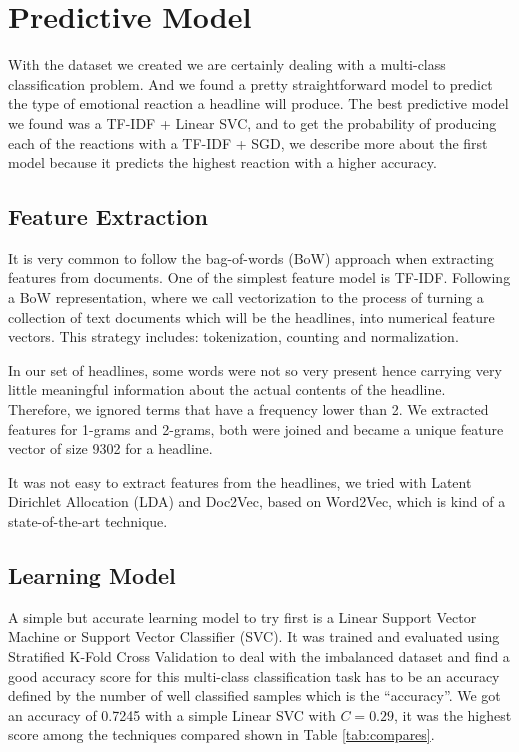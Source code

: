 \documentclass[9pt]{article}
\begin{document}
\section{Predictive Model} 

With the dataset we created we are certainly dealing with a multi-class classification problem. And we found a pretty straightforward model to predict the type of emotional reaction a headline will produce. The best predictive model we found was a TF-IDF + Linear SVC, and to get the probability of producing each of the reactions with a TF-IDF + SGD, we describe more about the first model because it predicts the highest reaction with a higher accuracy.

\subsection{Feature Extraction}

It is very common to follow the bag-of-words (BoW) approach when extracting features from documents. One of the simplest feature model is TF-IDF. Following a BoW representation, where we call vectorization to the process of turning a collection of text documents which will be the headlines, into numerical feature vectors. This strategy includes: tokenization, counting and normalization.

In our set of headlines, some words were not so very present hence carrying very little meaningful information about the actual contents of the headline. Therefore, we ignored terms that have a frequency lower than 2. We extracted features for 1-grams and 2-grams, both were joined and became a unique feature vector of size 9302 for a headline.

It was not easy to extract features from the headlines, we tried with Latent Dirichlet Allocation (LDA) and Doc2Vec, based on Word2Vec, which is kind of a state-of-the-art technique.

\subsection{Learning Model}

A simple but accurate learning model to try first is a Linear Support Vector Machine or Support Vector Classifier (SVC). It was trained and evaluated using Stratified K-Fold Cross Validation to deal with the imbalanced dataset and find a good accuracy score for this multi-class classification task has to be an accuracy defined by the number of well classified samples which is the ``accuracy''. We got an accuracy of 0.7245 with a simple Linear SVC with $C = 0.29$, it was the highest score among the techniques compared shown in Table \ref{tab:compares}.
\end{document}
